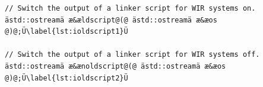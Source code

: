 \begin{lstlisting}[style=code,float=h,caption={Declaration of \texttt{ldscript} and \texttt{noldscript} Stream Manipulators in file \texttt{wirio.h}},label=lst:ioldscript]
// Switch the output of a linker script for WIR systems on.
ästd::ostreamä æ&ældscript@(@ ästd::ostreamä æ&æos @)@;Ü\label{lst:ioldscript1}Ü

// Switch the output of a linker script for WIR systems off.
ästd::ostreamä æ&ænoldscript@(@ ästd::ostreamä æ&æos @)@;Ü\label{lst:ioldscript2}Ü
\end{lstlisting}


\cleardoubleoddpage

